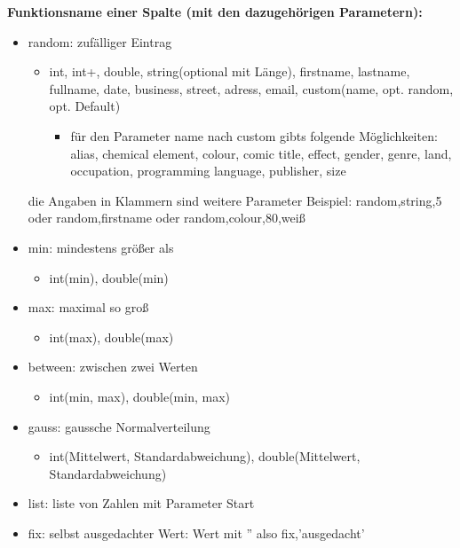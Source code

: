 \documentclass[11pt]{report}
\begin{document}
\bigskip\noindent
\textbf{Funktionsname einer Spalte (mit den dazugehörigen Parametern):}
\begin{itemize}

\item random: zufälliger Eintrag
\begin{itemize}
\item	int, int+, double, string(optional mit Länge), firstname, lastname, fullname, date, business, street, adress, email, custom(name, opt. random, opt. Default)
\begin{itemize}
\item	für den Parameter name nach custom gibts folgende Möglichkeiten: alias, chemical element, colour, comic title, effect, gender, genre, land, occupation, programming language, publisher, size
\end{itemize}
\end{itemize}

die Angaben in Klammern sind weitere Parameter
Beispiel: random,string,5 oder random,firstname oder random,colour,80,weiß

\item min: mindestens größer als
\begin{itemize}
\item int(min), double(min)
\end{itemize}

\item max: maximal so groß
\begin{itemize}
\item int(max), double(max)
\end{itemize}

\item between: zwischen zwei Werten
\begin{itemize}
\item int(min, max), double(min, max)
\end{itemize}
	

\item gauss: gaussche Normalverteilung
\begin{itemize}
\item int(Mittelwert, Standardabweichung), double(Mittelwert, Standardabweichung)
\end{itemize}


\item list: liste von Zahlen mit Parameter Start

\item fix: selbst ausgedachter Wert: Wert mit '' also fix,'ausgedacht'
\end{itemize}
\end{document}
